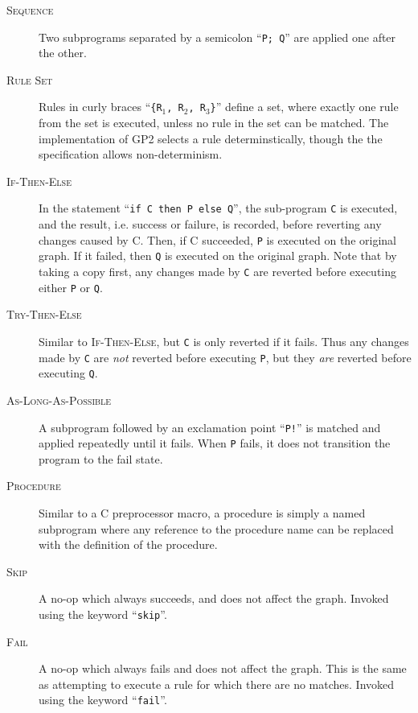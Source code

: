 \documentclass[authoryearcitations]{UoYCSproject}
\begin{document}
\begin{description}
    \item[\textsc{Sequence}]
    Two subprograms separated by a semicolon ``\texttt{P; Q}'' are applied
    one after the other.

    \item[\textsc{Rule Set}]
    Rules in curly braces ``\texttt{\{R$_{\text{1}}$, R$_{\text{2}}$, R$_{\text{3}}$\}}''
    define a set, where exactly one rule from the set is executed, unless no rule in
    the set can be matched. The implementation of GP2 selects a rule determinstically,
    though the the specification allows non-determinism.

    \item[\textsc{If-Then-Else}]
    In the statement ``\texttt{if C then P else Q}'', the sub-program \texttt{C}
    is executed, and the result, i.e. success or failure, is recorded, before
    reverting any changes caused by C. Then, if C succeeded, \texttt{P} is
    executed on the original graph. If it failed, then \texttt{Q} is executed on
    the original graph. Note that by taking a copy first, any changes made by
    \texttt{C} are reverted before executing either \texttt{P} or \texttt{Q}.

    \item[\textsc{Try-Then-Else}]
    Similar to \textsc{If-Then-Else}, but \texttt{C} is only reverted if it fails.
    Thus any changes made by \texttt{C} are \emph{not} reverted before executing
    \texttt{P}, but they \emph{are} reverted before executing \texttt{Q}.

    \item[\textsc{As-Long-As-Possible}]
    A subprogram followed by an exclamation point ``\texttt{P!}'' is matched and
    applied repeatedly until it fails. When \texttt{P} fails, it does not transition
    the program to the fail state.

    \item[\textsc{Procedure}]
    Similar to a C preprocessor macro, a procedure is simply a named subprogram
    where any reference to the procedure name can be replaced with the definition
    of the procedure.

    \item[\textsc{Skip}]
    A no-op which always succeeds, and does not affect the graph. Invoked using the
    keyword ``\texttt{skip}''.

    \item[\textsc{Fail}]
    A no-op which always fails and does not affect the graph. This is the same as
    attempting to execute a rule for which there are no matches. Invoked using
    the keyword ``\texttt{fail}''.
\end{description}
\end{document}
